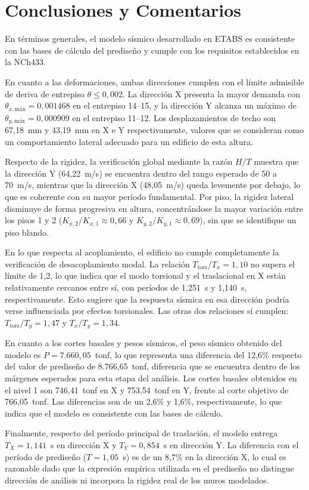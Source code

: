 \section{Conclusiones y Comentarios}

En términos generales, el modelo sísmico desarrollado en ETABS es consistente con las bases de 
cálculo del prediseño y cumple con los requisitos establecidos en la NCh433.

En cuanto a las deformaciones, ambas direcciones cumplen con el límite admisible de 
deriva de entrepiso $\theta \leq 0{,}002$. La dirección X presenta la mayor demanda con 
$\theta_{x,\text{máx}} = 0{,}001468$ en el entrepiso 14--15, y la dirección Y alcanza un máximo 
de $\theta_{y,\text{máx}} = 0{,}000909$ en el entrepiso 11--12. Los desplazamientos de techo 
son 67,18~mm y 43,19~mm en X e Y respectivamente, valores que se consideran como un comportamiento 
lateral adecuado para un edificio de esta altura.

Respecto de la rigidez, la verificación global mediante la razón $H/T$ muestra que la 
dirección Y (64,22~m/s) se encuentra dentro del rango esperado de 50 a 70~m/s, mientras que 
la dirección X (48,05~m/s) queda levemente por debajo, lo que es coherente con su mayor 
período fundamental. Por piso, la rigidez lateral disminuye de forma progresiva en altura, 
concentrándose la mayor variación entre los pisos 1 y 2 ($K_{x,2}/K_{x,1} \approx 0{,}66$ 
y $K_{y,2}/K_{y,1} \approx 0{,}69$), sin que se identifique un piso blando.

En lo que respecta al acoplamiento, el edificio no cumple completamente la 
verificación de desacoplamiento modal. La relación $T_{\text{tors}}/T_x = 1{,}10$ no supera 
el límite de 1,2, lo que indica que el modo torsional y el traslacional en X están 
relativamente cercanos entre sí, con períodos de 1,251~s y 1,140~s, respectivamente. Esto 
sugiere que la respuesta sísmica en esa dirección podría verse influenciada por efectos 
torsionales. Las otras dos relaciones sí cumplen: $T_{\text{tors}}/T_y = 1{,}47$ y 
$T_x/T_y = 1{,}34$.

En cuanto a los cortes basales y pesos sísmicos, el peso sísmico obtenido del modelo 
es $P = 7.660{,}05$~tonf, lo que representa una diferencia del 12,6\% respecto del valor de 
prediseño de 8.766,65~tonf, diferencia que se encuentra dentro de los márgenes esperados para 
esta etapa del análisis. Los cortes basales obtenidos en el nivel 1 son 746,41~tonf en X y 
753,54~tonf en Y, frente al corte objetivo de 766,05~tonf. Las diferencias son de un 2,6\% 
y 1,6\%, respectivamente, lo que indica que el modelo es consistente con las bases de cálculo.


Finalmente, respecto del período principal de traslación, el modelo entrega 
$T_X = 1{,}141$~s en dirección X y $T_Y = 0{,}854$~s en dirección Y. La diferencia con el 
período de prediseño ($T = 1{,}05$~s) es de un 8,7\% en la dirección X, lo cual es razonable 
dado que la expresión empírica utilizada en el prediseño no distingue dirección de análisis 
ni incorpora la rigidez real de los muros modelados.